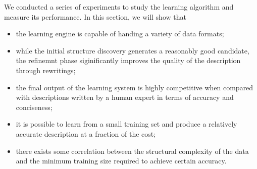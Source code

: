 %

We conducted a series of experiments to study the learning algorithm
and measure its performance. In this section, we will show that
\begin{itemize}
\item the learning engine is capable of handing a variety of data formats;
\item while the initial structure discovery generates a reasonably
good candidate, the refinemnt phase siginificantly improves the
quality of the description through rewritings; 
\item the final output of the learning system is highly competitive
when compared with descriptions written by a human expert 
in terms of accuracy and conciseness; 
\item it is possible to learn from a small training set and produce
a relatively accurate description at a fraction of the cost;
\item there exists some correlation between the structural complexity
of the data and the minimum training size required to achieve certain
accuracy.
\end{itemize}

